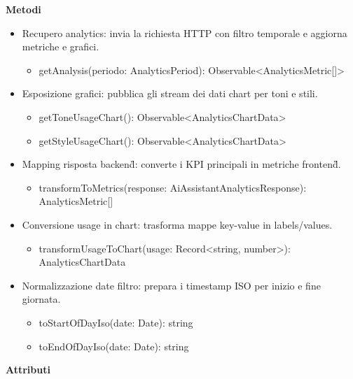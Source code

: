 \documentclass[a4paper,11pt]{article}
\begin{document}
\textbf{Metodi}
\begin{itemize}[noitemsep, topsep=0pt]
\item Recupero analytics: invia la richiesta HTTP con filtro temporale e aggiorna metriche e grafici.
\begin{itemize}[noitemsep, topsep=0pt]
\item getAnalysis(periodo: AnalyticsPeriod): Observable<AnalyticsMetric[]>
\end{itemize}

\item Esposizione grafici: pubblica gli stream dei dati chart per toni e stili.
\begin{itemize}[noitemsep, topsep=0pt]
\item getToneUsageChart(): Observable<AnalyticsChartData>
\item getStyleUsageChart(): Observable<AnalyticsChartData>
\end{itemize}

\item Mapping risposta backend\G{}: converte i KPI principali in metriche frontend\G{}.
\begin{itemize}[noitemsep, topsep=0pt]
\item transformToMetrics(response: AiAssistantAnalyticsResponse): AnalyticsMetric[]
\end{itemize}

\item Conversione usage in chart: trasforma mappe key-value in labels/values.
\begin{itemize}[noitemsep, topsep=0pt]
\item transformUsageToChart(usage: Record<string, number>): AnalyticsChartData
\end{itemize}

\item Normalizzazione date filtro: prepara i timestamp ISO per inizio e fine giornata.
\begin{itemize}[noitemsep, topsep=0pt]
\item toStartOfDayIso(date: Date): string
\item toEndOfDayIso(date: Date): string
\end{itemize}
\end{itemize}
\textbf{Attributi}
\end{document}
